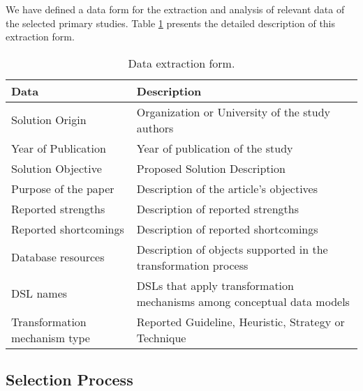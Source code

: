 We have defined a data form for the extraction and analysis of relevant data of the selected primary studies.
Table \ref{tab:DataExtractionForm} presents the detailed description of this extraction form.

\begin{table}[!htb]
    \centering
    \scriptsize
    \caption{Data extraction form.}
    \label{tab:DataExtractionForm}
    \begin{tabular}{p{5cm}|p{10cm}}
    \bottomrule
    \rowcolor[HTML]{C0C0C0} 
    \textbf{Data} & \textbf{Description} \\
    \hline
    Solution Origin & Organization or University of the study authors
    \\
    Year of Publication & Year of publication of the study
    \\
    Solution Objective & Proposed Solution Description
    \\
    Purpose of the paper & Description of the article's objectives
    \\
    Reported strengths & Description of reported strengths
    \\
    Reported shortcomings & Description of reported shortcomings
    \\
    Database resources & Description of objects supported in the transformation process
    \\
    DSL names & DSLs that apply transformation mechanisms among conceptual data models
    \\
    Transformation mechanism type & Reported Guideline, Heuristic, Strategy or Technique
    \\
    \toprule
    \end{tabular}
\end{table}

\subsection{Selection Process} \label{ssec_slm:selectionProcess}

